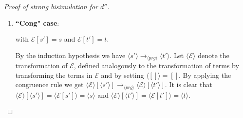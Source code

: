 \begin{proof}[Proof of strong bisimulation for $d''$]
\begin{enumerate}
\begin{itemize}
For well-typedness, simply treat the missing types temporarily, that is, for the sake of (*), as codata types. This is no problem for the restriction to the domain of $d^{core}$, since such types could be introduced inside the Codata Fragment with codata definitions. To be more precise, empty function definitions can be added for missing ones and empty codata definitions for missing types, and removed again after using (*), without adding or removing possible reductions, respectively. All in all, we have by (*):
\begin{equation*}
s \longrightarrow_{prg'} t \iff \langle s \rangle \longrightarrow_{\langle prg' \rangle^{d^{core}}} \langle t \rangle
\end{equation*}

But this program $\langle prg' \rangle^{d^{core}}$ is a subset of $\langle prg \rangle$, as can be seen in the definition of $d''$. This implies the desired $\langle s \rangle \longrightarrow_{\langle prg \rangle} \langle t \rangle$.

\end{itemize}

Other cases are excluded by the relevant input fragment.

\item \textbf{``Cong" case}:

\begin{prooftree}
\end{prooftree}

with $\mathcal{E}[s'] = s$ and $\mathcal{E}[t'] = t$.

By the induction hypothesis we have $\langle s' \rangle \longrightarrow_{\langle prg \rangle} \langle t' \rangle$. Let $\langle \mathcal{E} \rangle$ denote the transformation of $\mathcal{E}$, defined analogously to the transformation of terms by transforming the terms in $\mathcal{E}$ and by setting $\langle [] \rangle = []$. By applying the congruence rule we get $\langle \mathcal{E} \rangle[\langle s' \rangle] \longrightarrow_{\langle prg \rangle} \langle \mathcal{E} \rangle[\langle t' \rangle]$. It is clear that $\langle \mathcal{E} \rangle[\langle s' \rangle] = \langle \mathcal{E}[s'] \rangle = \langle s \rangle$ and $\langle \mathcal{E} \rangle[\langle t' \rangle] = \langle \mathcal{E}[t'] \rangle = \langle t \rangle$.

\end{enumerate}


\end{proof}
